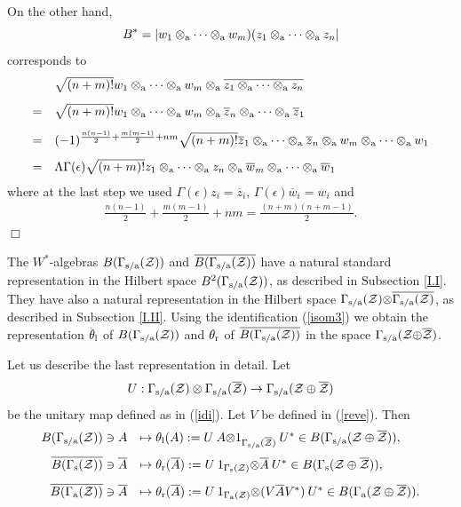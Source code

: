 \documentclass{svmult}
\def\bar{\overline}
\def\l{{\rm l}}
\def\r{{\rm r}}
\def\s{{\rm s}}
\def\sa{{\rm s/a}}
\def\cZ{{\cal Z}}
\def\a{{\rm a}}
\def\qed{$\Box$\medskip}
\def\l{{\rm l}}
\def\r{{\rm r}}
\def\s{{\rm s}}
\begin{document}
On the other hand,
\[B^*
=|w_1\otimes_\a\cdots\otimes_\a w_m)(z_1\otimes_\a\cdots\otimes_\a z_n|
\]
corresponds to
\[\begin{array}{rl}
&\sqrt{(n+m)!}
w_1\otimes_\a\cdots\otimes_\a w_m\otimes_\a\bar{z_1\otimes_\a\cdots\otimes_\a
  z_n} \\[3mm]=
&\sqrt{(n+m)!}
w_1\otimes_\a\cdots\otimes_\a w_m\otimes_\a\bar z_n\otimes_\a\cdots\otimes_\a
  \bar z_1 \\[3mm]
 =&
(-1)^{\frac{n(n-1)}2+\frac{m(m-1)}2+nm}
\sqrt{(n+m)!}
\bar z_1\otimes_\a\cdots\otimes_\a \bar z_n\otimes_\a w_m\otimes_\a\cdots\otimes_\a
  w_1
\\[3mm]
=&\Lambda\Gamma(\epsilon)
\sqrt{(n+m)!}
z_1\otimes_\a\cdots\otimes_\a z_n\otimes_\a\bar w_m\otimes_\a\cdots\otimes_\a
  \bar w_1
\end{array}\]
where at the last step we used $\Gamma(\epsilon)z_i=\bar z_i$,
$\Gamma(\epsilon)\bar w_i=w_i$ and
\[\begin{array}{l}
\frac{n(n-1)}2+\frac{m(m-1)}2+nm=\frac{(n+m)(n+m-1)}{2}.\end{array}\]
\qed






The $W^*$-algebras $B(\Gamma_\sa(\cZ))$ and 
$\bar{B(\Gamma_\sa(\cZ))}$ have a natural standard
representation 
in the Hilbert space $B^2(\Gamma_\sa(\cZ))$, as described in Subsection
\ref{I.I}. They have also a natural
  representation in
the Hilbert space $\Gamma_\sa(\cZ){\otimes}\bar{\Gamma_\sa(\cZ)}$,
 as described in  Subsection \ref{I.II}. Using the identification
(\ref{isom3}) we obtain the representation
$\theta_\l$  of $B(\Gamma_\sa(\cZ))$
and 
$\theta_\r$ of  $\bar{B(\Gamma_\sa(\cZ))}$
in the space $ \Gamma_\sa(\cZ{\oplus}\bar\cZ)$.


Let us describe the last representation in detail.
Let 
 \begin{equation} U: \Gamma_\sa(\cZ)\otimes\Gamma_\sa(\bar\cZ)\to
\Gamma_\sa(\cZ\oplus\bar\cZ)\label{vonn}\end{equation}
be the unitary map defined as in (\ref{idi}).
Let $V$ be defined 
in (\ref{reve}).
Then
\begin{equation}\begin{array}{rl}
B(\Gamma_\sa(\cZ)) \ni A&\mapsto\theta_\l(A):
=U\:A{\otimes} 
1_{\Gamma_\sa(\bar \cZ)}\:U^*\in B(\Gamma_\sa(\cZ\oplus\bar\cZ)),\\[3mm]
\bar{B(\Gamma_\s(\cZ))}\ni \bar A&\mapsto
\theta_\r(\bar A):=U\: 1_{\Gamma_\s( \cZ)}{\otimes}\bar A
\: U^*\in B(\Gamma_\s(\cZ\oplus\bar\cZ)),\\[3mm]
\bar{B(\Gamma_\a(\cZ))}\ni \bar A&\mapsto
\theta_\r(\bar A):=U\: 1_{\Gamma_\a( \cZ)}{\otimes}(V\bar AV^*)
\: U^*\in B(\Gamma_\a(\cZ\oplus\bar\cZ)).
\end{array} 
\label{repo1a}\end{equation}
\end{document}
